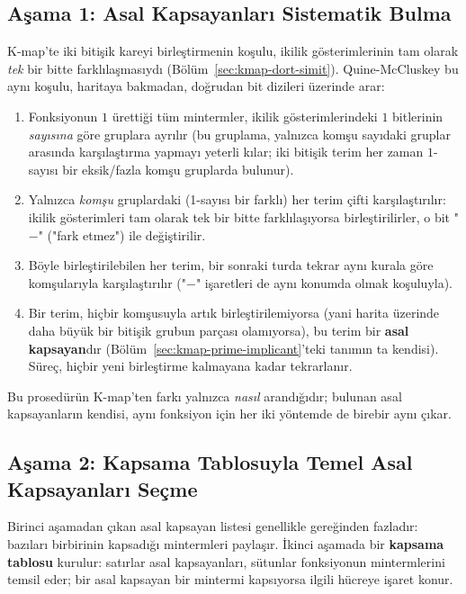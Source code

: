 \subsection{Aşama 1: Asal Kapsayanları Sistematik Bulma}\label{sec:qm-asal-kapsayan}
K-map'te iki bitişik kareyi birleştirmenin koşulu, ikilik gösterimlerinin tam olarak
\emph{tek} bir bitte farklılaşmasıydı (Bölüm~\ref{sec:kmap-dort-simit}). Quine-McCluskey
bu aynı koşulu, haritaya bakmadan, doğrudan bit dizileri üzerinde arar:
\begin{enumerate}[nosep, leftmargin=*]
    \item Fonksiyonun $1$ ürettiği tüm mintermler, ikilik gösterimlerindeki $1$
    bitlerinin \emph{sayısına} göre gruplara ayrılır (bu gruplama, yalnızca komşu
    sayıdaki gruplar arasında karşılaştırma yapmayı yeterli kılar; iki bitişik terim
    her zaman $1$-sayısı bir eksik/fazla komşu gruplarda bulunur).
    \item Yalnızca \emph{komşu} gruplardaki (1-sayısı bir farklı) her terim çifti
    karşılaştırılır: ikilik gösterimleri tam olarak tek bir bitte farklılaşıyorsa
    birleştirilirler, o bit "$-$" ("fark etmez") ile değiştirilir.
    \item Böyle birleştirilebilen her terim, bir sonraki turda tekrar aynı kurala göre
    komşularıyla karşılaştırılır ("$-$" işaretleri de aynı konumda olmak koşuluyla).
    \item Bir terim, hiçbir komşusuyla artık birleştirilemiyorsa (yani harita üzerinde
    daha büyük bir bitişik grubun parçası olamıyorsa), bu terim bir \textbf{asal
    kapsayan}dır (Bölüm~\ref{sec:kmap-prime-implicant}'teki tanımın ta kendisi). Süreç,
    hiçbir yeni birleştirme kalmayana kadar tekrarlanır.
\end{enumerate}
Bu prosedürün K-map'ten farkı yalnızca \emph{nasıl} arandığıdır; bulunan asal
kapsayanların kendisi, aynı fonksiyon için her iki yöntemde de birebir aynı çıkar.

\subsection{Aşama 2: Kapsama Tablosuyla Temel Asal Kapsayanları Seçme}\label{sec:qm-essential}
Birinci aşamadan çıkan asal kapsayan listesi genellikle gereğinden fazladır: bazıları
birbirinin kapsadığı mintermleri paylaşır. İkinci aşamada bir \textbf{kapsama tablosu}
kurulur: satırlar asal kapsayanları, sütunlar fonksiyonun mintermlerini temsil eder;
bir asal kapsayan bir mintermi kapsıyorsa ilgili hücreye işaret konur.

